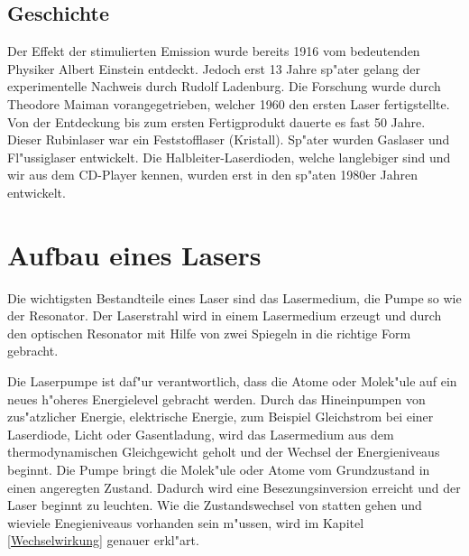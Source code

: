 \begin{refsection}

\subsection{Geschichte}

Der Effekt der stimulierten Emission wurde bereits 1916 vom bedeutenden 
Physiker Albert Einstein entdeckt. Jedoch erst 13 Jahre sp"ater gelang der 
experimentelle Nachweis durch Rudolf Ladenburg. Die Forschung wurde durch 
Theodore Maiman vorangegetrieben, welcher 1960 den ersten Laser 
fertigstellte. Von der Entdeckung bis zum ersten Fertigprodukt dauerte es 
fast 50 Jahre. Dieser Rubinlaser war ein Feststofflaser (Kristall). Sp"ater 
wurden Gaslaser und Fl"ussiglaser entwickelt. Die Halbleiter-Laserdioden, 
welche langlebiger sind und wir aus dem CD-Player kennen, wurden erst in den 
sp"aten 1980er Jahren entwickelt.


\section{Aufbau eines Lasers}

Die wichtigsten Bestandteile eines Laser sind das Lasermedium, die Pumpe so 
wie der Resonator. Der Laserstrahl wird in einem Lasermedium erzeugt und 
durch den optischen Resonator mit Hilfe von zwei Spiegeln in die richtige 
Form gebracht. 

Die Laserpumpe ist daf"ur verantwortlich, dass die Atome oder Molek"ule auf 
ein neues h"oheres Energielevel gebracht werden. Durch das Hineinpumpen von 
zus"atzlicher Energie, elektrische Energie, 
zum Beispiel Gleichstrom bei einer Laserdiode, Licht oder 
Gasentladung, wird das Lasermedium aus dem thermodynamischen Gleichgewicht 
geholt und der Wechsel der Energieniveaus beginnt. Die Pumpe bringt die 
Molek"ule oder Atome vom Grundzustand in einen angeregten Zustand. Dadurch 
wird eine Besezungsinversion erreicht und der Laser beginnt zu leuchten. Wie 
die Zustandswechsel von statten gehen und wieviele Enegieniveaus vorhanden 
sein m"ussen, wird im Kapitel \ref{Wechselwirkung} genauer erkl"art.


\end{refsection}
